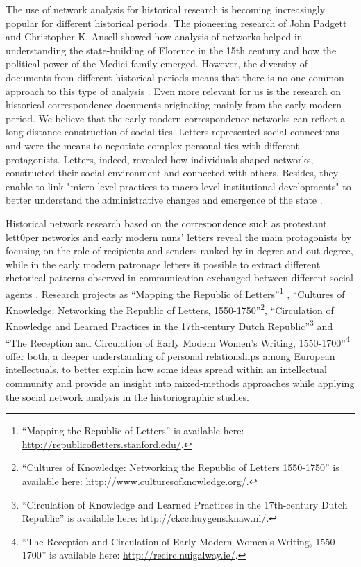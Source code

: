 \documentclass{article}
\begin{document}
The use of network analysis for historical research is becoming increasingly popular for different historical periods. The pioneering research of John Padgett and Christopher K. Ansell \cite{padgett_robust_1993} showed how analysis of networks helped in understanding the state-building of Florence in the 15th century and how the political power of the Medici family emerged. However, the diversity of documents from different historical periods means that there is no one common approach to this type of analysis \cite{mclean_circulation_2014}. Even more relevant for us is the research on historical correspondence documents originating mainly from the early modern period. We believe that the early-modern correspondence networks can reflect a long-distance construction of social ties. Letters represented social connections and were the means to negotiate complex personal ties with different protagonists. Letters, indeed, revealed how individuals shaped networks, constructed their social environment and connected with others. Besides, they enable to link "micro-level practices to macro-level institutional developments" to better understand the administrative changes and emergence of the state \cite{mclean_art_2007}. 

Historical network research based on the correspondence such as protestant lett0per networks \cite{ahnert_protestant_2015} and early modern nuns’ letters \cite{mcshane_visualising_2018} reveal the main protagonists by focusing on the role of recipients and senders ranked by in-degree and out-degree, while in the early modern patronage letters it possible to extract different rhetorical patterns observed in communication exchanged between different social agents \cite{mclean_art_2007}. Research projects as ``Mapping the Republic of Letters''\footnote{``Mapping the Republic of Letters'' is available here: \url{http://republicofletters.stanford.edu/}.} \cite{edelstein_historical_2017}, ``Cultures of Knowledge: Networking the Republic of Letters, 1550-1750''\footnote{``Cultures of Knowledge: Networking the Republic of Letters 1550-1750'' is available here: \url{http://www.culturesofknowledge.org/}.}, ``Circulation of Knowledge and Learned Practices in the 17th-century Dutch Republic''\footnote{``Circulation of Knowledge and Learned Practices in the 17th-century Dutch Republic'' is available here:  \url{http://ckcc.huygens.knaw.nl/}.} \cite{roorda_letters_2010,van_den_heuvel_mapping_2015,van_den_heuvel_circles_2016} and ``The Reception and Circulation of Early Modern Women's Writing, 1550-1700''\footnote{``The Reception and Circulation of Early Modern Women's Writing, 1550-1700'' is available here: \url{http://recirc.nuigalway.ie/}.} \cite{booth_only_2017,coolahan_material_2017} offer both, a deeper understanding of personal relationships among European intellectuals, to better explain how some ideas spread within an intellectual community and provide an insight into mixed-methods approaches while applying the social network analysis in the historiographic studies. 
\end{document}
